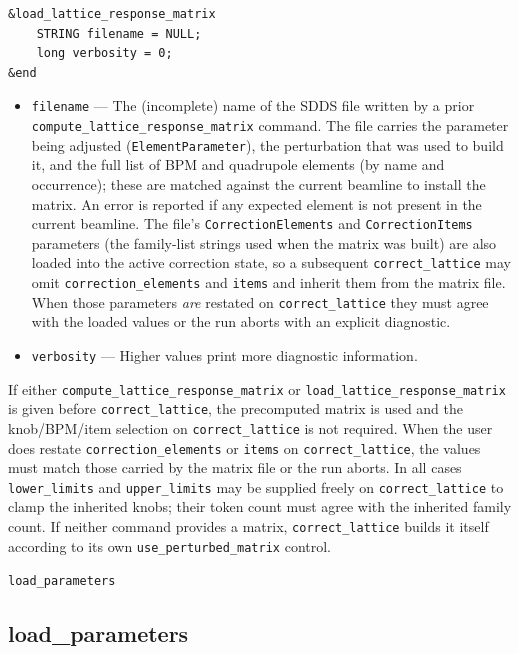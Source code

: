 \documentclass[11pt]{article}
\begin{document}
\begin{verbatim}
&load_lattice_response_matrix
    STRING filename = NULL;
    long verbosity = 0;
&end
\end{verbatim}

\begin{itemize}
\item \verb|filename| --- The (incomplete) name of the SDDS file written by
  a prior \verb|compute_lattice_response_matrix| command.  The file
  carries the parameter being adjusted (\verb|ElementParameter|), the
  perturbation that was used to build it, and the full list of BPM and
  quadrupole elements (by name and occurrence); these are matched against
  the current beamline to install the matrix.  An error is reported if
  any expected element is not present in the current beamline.
  The file's \verb|CorrectionElements| and \verb|CorrectionItems|
  parameters (the family-list strings used when the matrix was built)
  are also loaded into the active correction state, so a subsequent
  \verb|correct_lattice| may omit \verb|correction_elements| and
  \verb|items| and inherit them from the matrix file.  When those
  parameters {\em are} restated on \verb|correct_lattice| they must
  agree with the loaded values or the run aborts with an explicit
  diagnostic.
\item \verb|verbosity| --- Higher values print more diagnostic information.
\end{itemize}

If either \verb|compute_lattice_response_matrix| or
\verb|load_lattice_response_matrix| is given before
\verb|correct_lattice|, the precomputed matrix is used and the
knob/BPM/item selection on \verb|correct_lattice| is not required.
When the user does restate \verb|correction_elements| or \verb|items|
on \verb|correct_lattice|, the values must match those carried by the
matrix file or the run aborts.  In all cases \verb|lower_limits| and
\verb|upper_limits| may be supplied freely on \verb|correct_lattice|
to clamp the inherited knobs; their token count must agree with the
inherited family count.  If neither command provides a matrix,
\verb|correct_lattice| builds it itself according to its own
\verb|use_perturbed_matrix| control.

\newpage
\begin{center}{\Large\verb|load_parameters|}\end{center}
\subsection{load\_parameters \label{subsec:loadparameters}}
\end{document}
